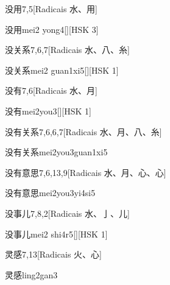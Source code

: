\begin{entry}{没用}{7,5}[Radicais ⽔、⽤]
  \begin{phonetics}{没用}{mei2 yong4}[][HSK 3]
  \end{phonetics}
\end{entry}

\begin{entry}{没关系}{7,6,7}[Radicais ⽔、⼋、⽷]
  \begin{phonetics}{没关系}{mei2 guan1xi5}[][HSK 1]
  \end{phonetics}
\end{entry}

\begin{entry}{没有}{7,6}[Radicais ⽔、⽉]
  \begin{phonetics}{没有}{mei2you3}[][HSK 1]
  \end{phonetics}
\end{entry}

\begin{entry}{没有关系}{7,6,6,7}[Radicais ⽔、⽉、⼋、⽷]
  \begin{phonetics}{没有关系}{mei2you3guan1xi5}
  \end{phonetics}
\end{entry}

\begin{entry}{没有意思}{7,6,13,9}[Radicais ⽔、⽉、⼼、⼼]
  \begin{phonetics}{没有意思}{mei2you3yi4si5}
  \end{phonetics}
\end{entry}

\begin{entry}{没事儿}{7,8,2}[Radicais ⽔、⼅、⼉]
  \begin{phonetics}{没事儿}{mei2 shi4r5}[][HSK 1]
  \end{phonetics}
\end{entry}

\begin{entry}{灵感}{7,13}[Radicais ⽕、⼼]
  \begin{phonetics}{灵感}{ling2gan3}
  \end{phonetics}
\end{entry}

